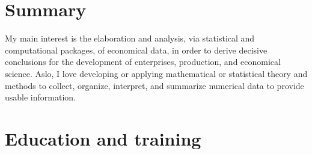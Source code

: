 \documentclass[letterpaper]{engineer_cv} %
\begin{document}
	\makeprofile %


	\section{Summary}

	My main interest is the elaboration and analysis, via statistical and computational packages, of economical data, in order to derive decisive conclusions for the development of enterprises, production, and economical science. Aslo, I love developing or applying mathematical or statistical theory and methods to collect, organize, interpret, and summarize numerical data to provide usable information.


	\section{Education and training}
\end{document}
